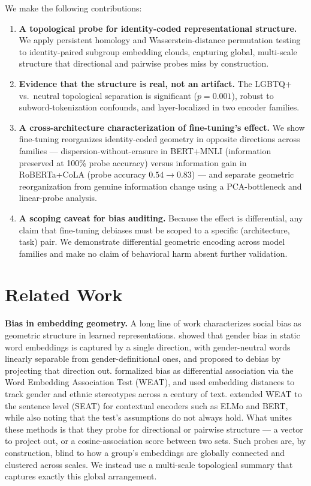 \documentclass[11pt]{article}
\begin{document}
We make the following contributions:
\begin{enumerate}
  \item \textbf{A topological probe for identity-coded representational structure.} We apply persistent homology and Wasserstein-distance permutation testing to identity-paired subgroup embedding clouds, capturing global, multi-scale structure that directional and pairwise probes miss by construction.
  \item \textbf{Evidence that the structure is real, not an artifact.} The LGBTQ+ vs.\ neutral topological separation is significant ($p = 0.001$), robust to subword-tokenization confounds, and layer-localized in two encoder families.
  \item \textbf{A cross-architecture characterization of fine-tuning's effect.} We show fine-tuning reorganizes identity-coded geometry in opposite directions across families --- dispersion-without-erasure in BERT+MNLI (information preserved at 100\% probe accuracy) versus information gain in RoBERTa+CoLA (probe accuracy $0.54 \rightarrow 0.83$) --- and separate geometric reorganization from genuine information change using a PCA-bottleneck and linear-probe analysis.
  \item \textbf{A scoping caveat for bias auditing.} Because the effect is differential, any claim that fine-tuning debiases must be scoped to a specific (architecture, task) pair. We demonstrate differential geometric encoding across model families and make no claim of behavioral harm absent further validation.
\end{enumerate}

\section{Related Work}\label{sec:related}

\textbf{Bias in embedding geometry.} A long line of work characterizes social bias as geometric structure in learned representations. \citet{bolukbasi2016man} showed that gender bias in static word embeddings is captured by a single direction, with gender-neutral words linearly separable from gender-definitional ones, and proposed to debias by projecting that direction out. \citet{caliskan2017semantics} formalized bias as differential association via the Word Embedding Association Test (WEAT), and \citet{garg2018word} used embedding distances to track gender and ethnic stereotypes across a century of text. \citet{may-etal-2019-measuring} extended WEAT to the sentence level (SEAT) for contextual encoders such as ELMo and BERT, while also noting that the test's assumptions do not always hold. What unites these methods is that they probe for directional or pairwise structure --- a vector to project out, or a cosine-association score between two sets. Such probes are, by construction, blind to how a group's embeddings are globally connected and clustered across scales. We instead use a multi-scale topological summary that captures exactly this global arrangement.
\end{document}
